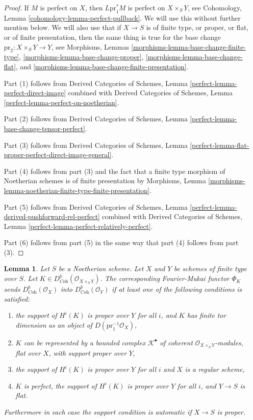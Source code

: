 \documentclass{stacks-project}
\theoremstyle{plain}
\newtheorem{lemma}[subsection]{Lemma}
\theoremstyle{definition}
\theoremstyle{remark}
\numberwithin{equation}{subsection}
\begin{document}
\begin{proof}
If $M$ is perfect on $X$, then $L\text{pr}_1^*M$
is perfect on $X \times_S Y$, see
Cohomology, Lemma \ref{cohomology-lemma-perfect-pullback}.
We will use this without further mention below.
We will also use that if $X \to S$ is of finite type, or proper, or
flat, or of finite presentation, then the same thing is true for
the base change $\text{pr}_2 : X \times_S Y \to Y$, see
Morphisms, Lemmas
\ref{morphisms-lemma-base-change-finite-type},
\ref{morphisms-lemma-base-change-proper},
\ref{morphisms-lemma-base-change-flat}, and
\ref{morphisms-lemma-base-change-finite-presentation}.

\medskip\noindent
Part (1) follows from
Derived Categories of Schemes, Lemma \ref{perfect-lemma-perfect-direct-image}
combined with
Derived Categories of Schemes, Lemma \ref{perfect-lemma-perfect-on-noetherian}.

\medskip\noindent
Part (2) follows from
Derived Categories of Schemes, Lemma
\ref{perfect-lemma-base-change-tensor-perfect}.

\medskip\noindent
Part (3) follows from
Derived Categories of Schemes, Lemma
\ref{perfect-lemma-flat-proper-perfect-direct-image-general}.

\medskip\noindent
Part (4) follows from part (3) and the fact that a finite type
morphism of Noetherian schemes is of finite presentation by Morphisms, Lemma
\ref{morphisms-lemma-noetherian-finite-type-finite-presentation}.

\medskip\noindent
Part (5) follows from
Derived Categories of Schemes, Lemma
\ref{perfect-lemma-derived-pushforward-rel-perfect} combined with
Derived Categories of Schemes, Lemma
\ref{perfect-lemma-perfect-relatively-perfect}.

\medskip\noindent
Part (6) follows from part (5) in the same way that part (4) follows from
part (3).
\end{proof}

\begin{lemma}
\label{lemma-fourier-mukai-Coh}
Let $S$ be a Noetherian scheme. Let $X$ and $Y$ be schemes of finite type
over $S$. Let $K \in D^b_{\textit{Coh}}(\mathcal{O}_{X \times_S Y})$.
The corresponding Fourier-Mukai functor $\Phi_K$ sends
$D^b_{\textit{Coh}}(\mathcal{O}_X)$ into $D^b_{\textit{Coh}}(\mathcal{O}_Y)$
if at least one of the following conditions is satisfied:
\begin{enumerate}
\item the support of $H^i(K)$ is proper over $Y$ for all $i$, and $K$
has finite tor dimension as an object of $D(\text{pr}_1^{-1}\mathcal{O}_X)$,
\item $K$ can be represented by a bounded complex $\mathcal{K}^\bullet$
of coherent $\mathcal{O}_{X \times_S Y}$-modules, flat over $X$, with support
proper over $Y$,
\item the support of $H^i(K)$ is proper over $Y$ for all $i$
and $X$ is a regular scheme,
\item $K$ is perfect, the support of $H^i(K)$ is proper over $Y$ for all $i$,
and $Y \to S$ is flat.
\end{enumerate}
Furthermore in each case the support condition is automatic
if $X \to S$ is proper.
\end{lemma}
\end{document}
